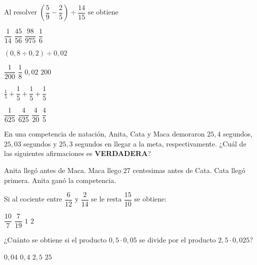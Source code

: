 \documentclass[spanish,letterpaper, 12pt, addpoints, answers]{exam}
\begin{document}
\begin{questions}
    \question[1] Al resolver $\left(\dfrac{5}{9}-\dfrac{2}{5}\right)\div \dfrac{14}{15}$ se obtiene
    \begin{choices}
        \choice $\dfrac{1}{14}$
        \choice $\dfrac{45}{56}$
        \choice $\dfrac{98}{975}$
        \CorrectChoice $\dfrac{1}{6}$
    \end{choices}
    \vspace{0.15in}

    \question[1] $(0,8\div 0,2)\div 0,02$
    \begin{choices}
        \choice $\dfrac{1}{200}$
        \choice $\dfrac{1}{8}$
        \choice $0,02$
        \CorrectChoice $200$
    \end{choices}
    \vspace{0.15in}


    \question[1] $\frac{1}{5}+\dfrac{1}{5}+\dfrac{1}{5}+\dfrac{1}{5}$
    \begin{choices}
        \choice $\dfrac{1}{625}$
        \choice $\dfrac{4}{625}$
        \choice $\dfrac{4}{20}$
        \CorrectChoice $\dfrac{4}{5}$
    \end{choices}
    \vspace{0.15in}

\newpage
    \question[1] En una competencia de natación, Anita, Cata y Maca demoraron $25,4$ segundos, $25,03$ segundos y $25,3$ segundos en llegar a la meta, respectivamente. ¿Cuál de las siguientes afirmaciones es \textbf{VERDADERA}?
    \begin{choices}
        \choice Anita llegó antes de Maca.
        \choice Maca llego 27 centesimas antes de Cata.
        \CorrectChoice Cata llegó primera.
        \choice Anita ganó la competencia.
    \end{choices}
    \vspace{0.15in}

    \question[1] Si al cociente entre $\dfrac{6}{12}$ y $\dfrac{2}{14}$ se le resta $\dfrac{15}{10}$ se obtiene:

    \begin{choices}
        \choice $\dfrac{10}{7}$
        \choice $\dfrac{7}{19}$
        \choice $1$
        \CorrectChoice $2$
    \end{choices}

    \question[1] ¿Cuánto se obtiene si el producto $0,5\cdot 0,05$ se divide por el producto $2,5\cdot 0,025$?
    \begin{choices}
        \choice $0,04$
        \CorrectChoice $0,4$
        \choice $2,5$
        \choice $25$
    \end{choices}


\end{questions}
\end{document}
